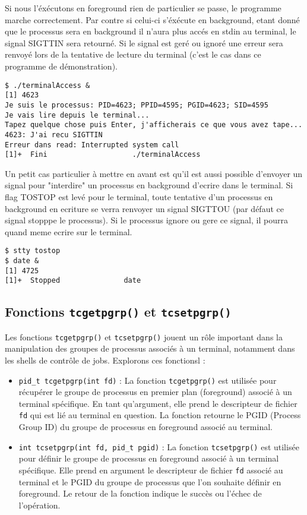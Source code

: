 Si nous l'éxécutons en foreground rien de particulier se passe, le programme marche correctement. Par contre si celui-ci s'éxécute en background, etant donné que
le processus sera en background il n'aura plus accés en stdin au terminal, le signal SIGTTIN sera retourné.
Si le signal est geré ou ignoré une erreur sera renvoyé lors de la tentative de lecture du terminal (c'est le cas dans ce programme de démonstration).

\begin{lstlisting}[style=blackstyle]
$ ./terminalAccess &
[1] 4623
Je suis le processus: PID=4623; PPID=4595; PGID=4623; SID=4595
Je vais lire depuis le terminal...
Tapez quelque chose puis Enter, j'afficherais ce que vous avez tape...
4623: J'ai recu SIGTTIN
Erreur dans read: Interrupted system call
[1]+  Fini                    ./terminalAccess
\end{lstlisting}

Un petit cas particulier à mettre en avant est qu'il est aussi possible d'envoyer un signal pour "interdire" un processus en background d'ecrire dans le terminal. Si flag TOSTOP est levé pour
le terminal, toute tentative d'un processus en background en ecriture se verra renvoyer un signal SIGTTOU (par défaut ce signal stopppe le processus). Si le processus ignore ou gere ce signal,
il pourra quand meme ecrire sur le terminal.

\begin{lstlisting}[style=blackstyle]
$ stty tostop
$ date &
[1] 4725
[1]+  Stopped               date
\end{lstlisting}

\subsection{Fonctions \texttt{tcgetpgrp()} et \texttt{tcsetpgrp()}}

Les fonctions \texttt{tcgetpgrp()} et \texttt{tcsetpgrp()} jouent un rôle important dans la manipulation des groupes de processus associés à un terminal, notamment dans les shells de contrôle de jobs. Explorons ces fonctionsl :

\begin{itemize}
    \item \texttt{pid\_t tcgetpgrp(int fd)} : La fonction \texttt{tcgetpgrp()} est utilisée pour récupérer le groupe de processus en premier plan (foreground) associé à un terminal spécifique. En tant qu'argument,
 elle prend le descripteur de fichier \texttt{fd} qui est lié au terminal en question. La fonction retourne le PGID (Process Group ID) du groupe de processus en foreground associé au terminal.

    \item \texttt{int tcsetpgrp(int fd, pid\_t pgid)} : La fonction \texttt{tcsetpgrp()} est utilisée pour définir le groupe de processus en foreground associé à un terminal spécifique. Elle prend en argument le descripteur de fichier \texttt{fd} associé
 au terminal et le PGID du groupe de processus que l'on souhaite définir en foreground. Le retour de la fonction indique le succès ou l'échec de l'opération.
\end{itemize}

